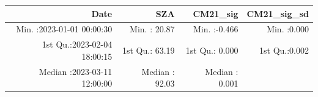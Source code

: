 \documentclass[
  10pt,
  a4paper,oneside]{article}
\begin{document}
\begin{longtable}[]{@{}rrrr@{}}
\toprule
\begin{minipage}[b]{0.33\columnwidth}\raggedleft
Date\strut
\end{minipage} & \begin{minipage}[b]{0.19\columnwidth}\raggedleft
SZA\strut
\end{minipage} & \begin{minipage}[b]{0.19\columnwidth}\raggedleft
CM21\_sig\strut
\end{minipage} & \begin{minipage}[b]{0.19\columnwidth}\raggedleft
CM21\_sig\_sd\strut
\end{minipage}\tabularnewline
\midrule
\endhead
\begin{minipage}[t]{0.33\columnwidth}\raggedleft
Min. :2023-01-01 00:00:30\strut
\end{minipage} & \begin{minipage}[t]{0.19\columnwidth}\raggedleft
Min. : 20.87\strut
\end{minipage} & \begin{minipage}[t]{0.19\columnwidth}\raggedleft
Min. :-0.466\strut
\end{minipage} & \begin{minipage}[t]{0.19\columnwidth}\raggedleft
Min. :0.000\strut
\end{minipage}\tabularnewline
\begin{minipage}[t]{0.33\columnwidth}\raggedleft
1st Qu.:2023-02-04 18:00:15\strut
\end{minipage} & \begin{minipage}[t]{0.19\columnwidth}\raggedleft
1st Qu.: 63.19\strut
\end{minipage} & \begin{minipage}[t]{0.19\columnwidth}\raggedleft
1st Qu.: 0.000\strut
\end{minipage} & \begin{minipage}[t]{0.19\columnwidth}\raggedleft
1st Qu.:0.002\strut
\end{minipage}\tabularnewline
\begin{minipage}[t]{0.33\columnwidth}\raggedleft
Median :2023-03-11 12:00:00\strut
\end{minipage} & \begin{minipage}[t]{0.19\columnwidth}\raggedleft
Median : 92.03\strut
\end{minipage} & \begin{minipage}[t]{0.19\columnwidth}\raggedleft
Median : 0.001\strut
\end{minipage} & \begin{minipage}[t]{0.19\columnwidth}\raggedleft

\end{minipage}
\end{longtable}
\end{document}
